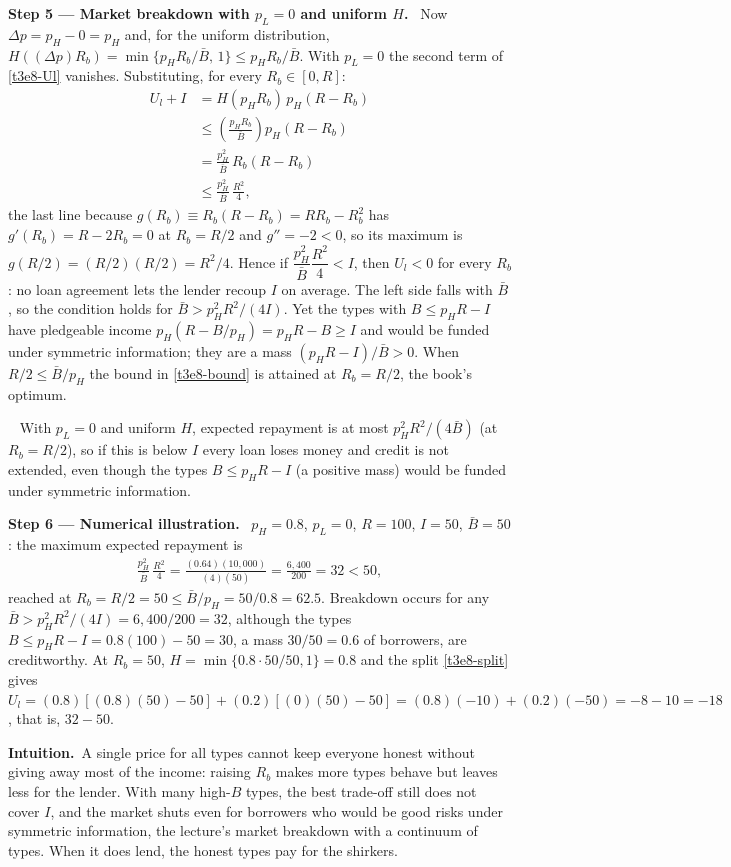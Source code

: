 \documentclass[11pt,a4paper]{article}
\newcommand{\step}[2]{\par\medskip\noindent\textbf{Step #1 --- #2.}~}
\newcommand{\intuition}{\par\medskip\noindent\textbf{Intuition.}~}
\newcommand{\answer}[1]{\par\smallskip\noindent\fbox{\textbf{Answer #1.}}~}
\begin{document}
\step{5}{Market breakdown with $p_L=0$ and uniform $H$} Now $\Delta p=p_H-0=p_H$ and, for the uniform distribution, $H((\Delta p)R_b)=\min\{p_HR_b/\bar B,\,1\}\le p_HR_b/\bar B$. With $p_L=0$ the second term of \eqref{t3e8-Ul} vanishes. Substituting, for every $R_b\in[0,R]$:
\begin{align}
  U_l + I &= H(p_HR_b)\,p_H(R-R_b) \nonumber\\
          &\le \left(\frac{p_HR_b}{\bar B}\right)p_H(R-R_b) \nonumber\\
          &= \frac{p_H^2}{\bar B}\,R_b(R-R_b) \nonumber\\
          &\le \frac{p_H^2}{\bar B}\,\frac{R^2}{4}, \label{t3e8-bound}
\end{align}
the last line because $g(R_b)\equiv R_b(R-R_b)=RR_b-R_b^2$ has $g'(R_b)=R-2R_b=0$ at $R_b=R/2$ and $g''=-2<0$, so its maximum is $g(R/2)=(R/2)(R/2)=R^2/4$. Hence if $\dfrac{p_H^2}{\bar B}\dfrac{R^2}{4}<I$, then $U_l<0$ for every $R_b$: no loan agreement lets the lender recoup $I$ on average. The left side falls with $\bar B$, so the condition holds for $\bar B>p_H^2R^2/(4I)$. Yet the types with $B\le p_HR-I$ have pledgeable income $p_H(R-B/p_H)=p_HR-B\ge I$ and would be funded under symmetric information; they are a mass $(p_HR-I)/\bar B>0$. When $R/2\le\bar B/p_H$ the bound in \eqref{t3e8-bound} is attained at $R_b=R/2$, the book's optimum.

\answer{(4)} With $p_L=0$ and uniform $H$, expected repayment is at most $p_H^2R^2/(4\bar B)$ (at $R_b=R/2$), so if this is below $I$ every loan loses money and credit is not extended, even though the types $B\le p_HR-I$ (a positive mass) would be funded under symmetric information.

\step{6}{Numerical illustration} $p_H=0.8$, $p_L=0$, $R=100$, $I=50$, $\bar B=50$: the maximum expected repayment is
\begin{align}
  \frac{p_H^2}{\bar B}\,\frac{R^2}{4} = \frac{(0.64)(10{,}000)}{(4)(50)} = \frac{6{,}400}{200} = 32 < 50, \nonumber
\end{align}
reached at $R_b=R/2=50\le\bar B/p_H=50/0.8=62.5$. Breakdown occurs for any $\bar B>p_H^2R^2/(4I)=6{,}400/200=32$, although the types $B\le p_HR-I=0.8(100)-50=30$, a mass $30/50=0.6$ of borrowers, are creditworthy. At $R_b=50$, $H=\min\{0.8\cdot50/50,1\}=0.8$ and the split \eqref{t3e8-split} gives $U_l=(0.8)[(0.8)(50)-50]+(0.2)[(0)(50)-50]=(0.8)(-10)+(0.2)(-50)=-8-10=-18$, that is, $32-50$.

\intuition A single price for all types cannot keep everyone honest without giving away most of the income: raising $R_b$ makes more types behave but leaves less for the lender. With many high-$B$ types, the best trade-off still does not cover $I$, and the market shuts even for borrowers who would be good risks under symmetric information, the lecture's market breakdown with a continuum of types. When it does lend, the honest types pay for the shirkers.
\end{document}
